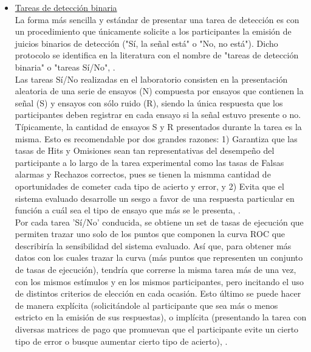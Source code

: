 \begin{itemize}
\item \underline{Tareas de detección binaria}\\

La forma más sencilla y estándar de presentar una tarea de detección es con un procedimiento que únicamente solicite a los participantes la emisión de juicios binarios de detección ("Sí, la señal está" o "No, no está"). Dicho protocolo se identifica en la literatura con el nombre de "tareas de detección binaria" o "tareas Sí/No", \parencite{McNicol2}.\\

Las tareas Sí/No realizadas en el laboratorio consisten en la presentación aleatoria de una serie de ensayos (N) compuesta por ensayos que contienen la señal (S) y ensayos con sólo ruido (R), siendo la única respuesta que los participantes deben registrar en cada ensayo si la señal estuvo presente o no. Típicamente, la cantidad de ensayos S y R presentados durante la tarea es la misma. Esto es recomendable por dos grandes razones: 1) Garantiza que las tasas de Hits y Omisiones sean tan representativas del desempeño del participante a lo largo de la tarea experimental como las tasas de Falsas alarmas y Rechazos correctos, pues se tienen la mismma cantidad de oportunidades de cometer cada tipo de acierto y error, y 2) Evita que el sistema evaluado desarrolle un sesgo a favor de una respuesta particular en función a cuál sea el tipo de ensayo que más se le presenta, \parencite{Nevin1969, Wickens}.\\

Por cada tarea 'Sí/No' conducida, se obtiene un set de tasas de ejecución que permiten trazar uno solo de los puntos que componen la curva ROC que describiría la sensibilidad del sistema evaluado. Así que, para obtener más datos con los cuales trazar la curva (más puntos que representen un conjunto de tasas de ejecución), tendría que correrse la misma tarea más de una vez, con los mismos estímulos y en los mismos participantes, pero incitando el uso de distintos criterios de elección en cada ocasión. Esto último se puede hacer de manera explícita (solicitándole al participante que sea más o menos estricto en la emisión de sus respuestas), o implícita (presentando la tarea con diversas matrices de pago que promuevan que el participante evite un cierto tipo de error o busque aumentar cierto tipo de acierto), \parencite{Wickens, McNicol2}.\\


\end{itemize}
